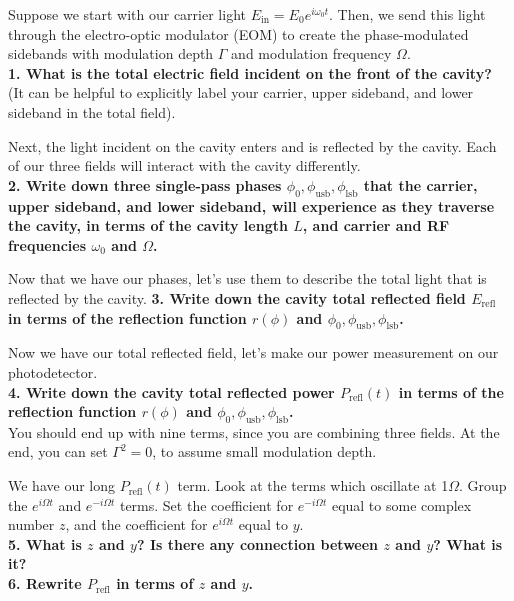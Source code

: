 \documentclass[11pt]{article}
\begin{document}
Suppose we start with our carrier light $E_\mathrm{in} = E_0 e^{i \omega_0 t}$.
Then, we send this light through the electro-optic modulator (EOM) to create the phase-modulated sidebands with modulation depth $\Gamma$ and modulation frequency $\Omega$.\\
\textcolor{Mahogany}{\textbf{1. What is the total electric field incident on the front of the cavity?}} \\ 
(It can be helpful to explicitly label your carrier, upper sideband, and lower sideband in the total field).

\vspace{0.5cm}

Next, the light incident on the cavity enters and is reflected by the cavity.
Each of our three fields will interact with the cavity differently.\\
\textcolor{Mahogany}{\textbf{2. Write down three single-pass phases $\phi_0, \phi_\mathrm{usb}, \phi_\mathrm{lsb}$ that the carrier, upper sideband, and lower sideband, will experience as they traverse the cavity, in terms of the cavity length $L$, and carrier and RF frequencies $\omega_0$ and $\Omega$.}}

\vspace{0.5cm}

Now that we have our phases, let's use them to describe the total light that is reflected by the cavity.
\textcolor{Mahogany}{\textbf{3. Write down the cavity total reflected field $E_\mathrm{refl}$ in terms of the reflection function $r(\phi)$ and $\phi_0, \phi_\mathrm{usb}, \phi_\mathrm{lsb}$.}}

\vspace{0.5cm}

Now we have our total reflected field, let's make our power measurement on our photodetector.\\
\textcolor{Mahogany}{\textbf{4. Write down the cavity total reflected power $P_\mathrm{refl}(t)$ in terms of the reflection function $r(\phi)$ and $\phi_0, \phi_\mathrm{usb}, \phi_\mathrm{lsb}$.}}\\
You should end up with nine terms, since you are combining three fields.
At the end, you can set $\Gamma^2 = 0$, to assume small modulation depth.

\vspace{0.5cm}

We have our long $P_\mathrm{refl}(t)$ term.  
Look at the terms which oscillate at 1$\Omega$.
Group the $e^{i \Omega t}$ and $e^{-i \Omega t}$ terms.  
Set the coefficient for $e^{-i \Omega t}$ equal to some complex number $z$,
and the coefficient for $e^{i \Omega t}$ equal to $y$.\\
\textcolor{Mahogany}{\textbf{5. What is $z$ and $y$?  Is there any connection between $z$ and $y$?  What is it?}}\\
\textcolor{Mahogany}{\textbf{6. Rewrite $P_\mathrm{refl}$ in terms of $z$ and $y$.}}
\end{document}
